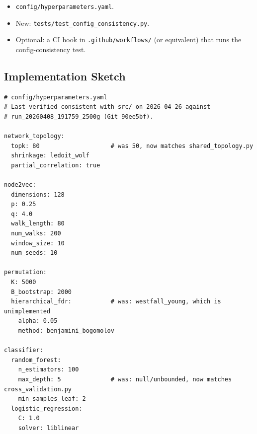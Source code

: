 \documentclass[11pt]{article}
\newcommand{\code}[1]{\texttt{#1}}
\begin{document}
\begin{itemize}[leftmargin=*]
\item \code{config/hyperparameters.yaml}.
\item New: \code{tests/test\_config\_consistency.py}.
\item Optional: a CI hook in \code{.github/workflows/} (or equivalent) that runs the config-consistency test.
\end{itemize}

\subsection{Implementation Sketch}

\begin{lstlisting}[style=yamlstyle,caption={Corrected hyperparameters.yaml (excerpt).}]
# config/hyperparameters.yaml
# Last verified consistent with src/ on 2026-04-26 against
# run_20260408_191759_2500g (Git 90ee5bf).

network_topology:
  topk: 80                    # was 50, now matches shared_topology.py
  shrinkage: ledoit_wolf
  partial_correlation: true

node2vec:
  dimensions: 128
  p: 0.25
  q: 4.0
  walk_length: 80
  num_walks: 200
  window_size: 10
  num_seeds: 10

permutation:
  K: 5000
  B_bootstrap: 2000
  hierarchical_fdr:           # was: westfall_young, which is unimplemented
    alpha: 0.05
    method: benjamini_bogomolov

classifier:
  random_forest:
    n_estimators: 100
    max_depth: 5              # was: null/unbounded, now matches cross_validation.py
    min_samples_leaf: 2
  logistic_regression:
    C: 1.0
    solver: liblinear
\end{lstlisting}
\end{document}
